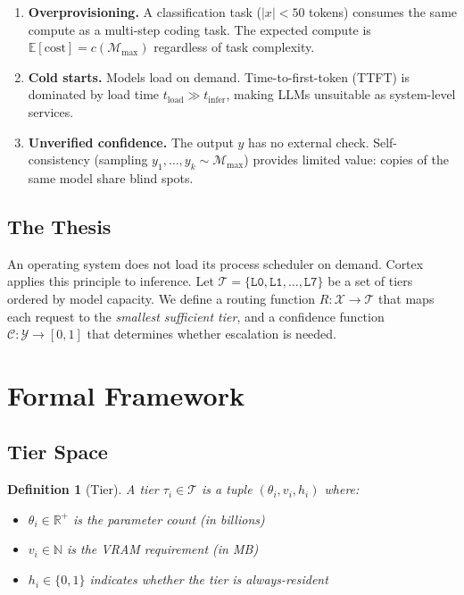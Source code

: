 \documentclass[11pt, a4paper, twocolumn]{article}
\newcommand{\tier}[1]{\texttt{L#1}}
\newcommand{\conf}{\mathcal{C}}
\newcommand{\R}{\mathbb{R}}
\newcommand{\model}{\mathcal{M}}
\newtheorem{definition}{Definition}
\begin{document}
\begin{enumerate}[leftmargin=*, nosep]
    \item \textbf{Overprovisioning.} A classification task ($|x| < 50$ tokens) consumes the same compute as a multi-step coding task. The expected compute is $\mathbb{E}[\text{cost}] = c(\model_{\max})$ regardless of task complexity.
    \item \textbf{Cold starts.} Models load on demand. Time-to-first-token (TTFT) is dominated by load time $t_{\text{load}} \gg t_{\text{infer}}$, making LLMs unsuitable as system-level services.
    \item \textbf{Unverified confidence.} The output $y$ has no external check. Self-consistency (sampling $y_1, \ldots, y_k \sim \model_{\max}$) provides limited value: copies of the same model share blind spots.
\end{enumerate}

\subsection{The Thesis}

An operating system does not load its process scheduler on demand. Cortex applies this principle to inference. Let $\mathcal{T} = \{\tier{0}, \tier{1}, \ldots, \tier{7}\}$ be a set of tiers ordered by model capacity. We define a routing function $R: \mathcal{X} \to \mathcal{T}$ that maps each request to the \textit{smallest sufficient tier}, and a confidence function $\conf: \mathcal{Y} \to [0, 1]$ that determines whether escalation is needed.

\section{Formal Framework}

\subsection{Tier Space}

\begin{definition}[Tier]
A \emph{tier} $\tau_i \in \mathcal{T}$ is a tuple $(\theta_i, v_i, h_i)$ where:
\begin{itemize}[nosep]
    \item $\theta_i \in \R^+$ is the parameter count (in billions)
    \item $v_i \in \mathbb{N}$ is the VRAM requirement (in MB)
    \item $h_i \in \{0, 1\}$ indicates whether the tier is always-resident
\end{itemize}
\end{definition}
\end{document}
